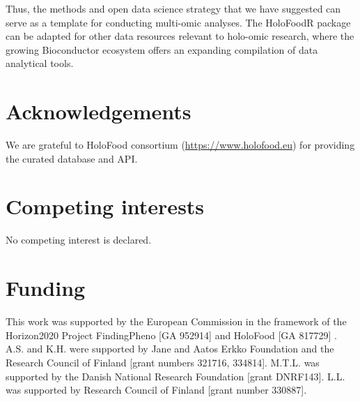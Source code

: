 \documentclass[unnumsec,webpdf,namedate,modern,large]{oup-authoring-template}%
\begin{document}
Thus, the methods and open data science strategy that we have suggested can serve as a template for conducting multi-omic analyses. The HoloFoodR package can be adapted for other data resources relevant to holo-omic research, where the growing Bioconductor ecosystem offers an expanding compilation of data analytical tools. 

\section{Acknowledgements}

We are grateful to HoloFood consortium (\url{https://www.holofood.eu}) for providing the curated database and API.


\section{Competing interests}
No competing interest is declared.

\section{Funding}
This work was supported by the European Commission in the framework of the Horizon2020 Project FindingPheno [GA  952914] and HoloFood [GA 817729] . A.S. and K.H. were  supported by Jane and Aatos Erkko Foundation and the Research Council of Finland [grant numbers 321716, 334814]. M.T.L. was supported by the Danish National Research Foundation [grant DNRF143].  L.L. was supported by Research Council of Finland [grant number 330887].

\printbibliography
\end{document}
